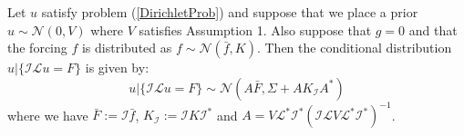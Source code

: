 \begin{proposition}
    \label{first_prop}
    Let $u$ satisfy problem (\ref{DirichletProb}) and suppose that we place a prior $u\sim\mathcal{N}(0,V)$ where $V$ satisfies Assumption 1. Also suppose that $g=0$ and that the forcing $f$ is distributed as $f\sim\mathcal{N}(\bar{f},K)$. Then the conditional distribution $u|\{\mathcal{I}\mathcal{L}u=F\}$ is given by:
    \begin{equation}
        \label{approx_prior}
        u|\{\mathcal{I}\mathcal{L}u=F\}\sim\mathcal{N}(A\bar{F},\Sigma+AK_{\mathcal{I}}A^{*})
    \end{equation}
    where we have $\bar{F}:=\mathcal{I}\bar{f}$, $K_{\mathcal{I}}:=\mathcal{I}K\mathcal{I}^{*}$ and $A=V\mathcal{L}^{*}\mathcal{I}^{*}(\mathcal{I}\mathcal{L}V\mathcal{L}^{*}\mathcal{I}^{*})^{-1}$.
\end{proposition}

